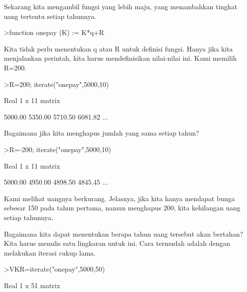 \documentclass[a4paper,10pt]{article}
\begin{document}
\begin{eulernotebook}
\begin{eulercomment}
\begin{eulercomment}
\begin{eulercomment}
\begin{eulercomment}
\begin{eulercomment}
\begin{eulercomment}
\begin{eulercomment}
\begin{eulercomment}
\begin{eulercomment}
Sekarang kita mengambil fungsi yang lebih maju, yang menambahkan
tingkat uang tertentu setiap tahunnya.
\end{eulercomment}
\begin{eulerprompt}
>function onepay (K) := K*q+R
\end{eulerprompt}
\begin{eulercomment}
Kita tidak perlu menentukan q atau R untuk definisi fungsi. Hanya jika
kita menjalankan perintah, kita harus mendefinisikan nilai-nilai ini.
Kami memilih R=200.
\end{eulercomment}
\begin{eulerprompt}
>R=200; iterate("onepay",5000,10)
\end{eulerprompt}
\begin{euleroutput}
  Real 1 x 11 matrix
  
      5000.00     5350.00     5710.50     6081.82     ...
\end{euleroutput}
\begin{eulercomment}
Bagaimana jika kita menghapus jumlah yang sama setiap tahun?
\end{eulercomment}
\begin{eulerprompt}
>R=-200; iterate("onepay",5000,10)
\end{eulerprompt}
\begin{euleroutput}
  Real 1 x 11 matrix
  
      5000.00     4950.00     4898.50     4845.45     ...
\end{euleroutput}
\begin{eulercomment}
Kami melihat uangnya berkurang. Jelasnya, jika kita hanya mendapat
bunga sebesar 150 pada tahun pertama, namun menghapus 200, kita
kehilangan uang setiap tahunnya.

Bagaimana kita dapat menentukan berapa tahun uang tersebut akan
bertahan? Kita harus menulis satu lingkaran untuk ini. Cara termudah
adalah dengan melakukan iterasi cukup lama.
\end{eulercomment}
\begin{eulerprompt}
>VKR=iterate("onepay",5000,50)
\end{eulerprompt}
\begin{euleroutput}
  Real 1 x 51 matrix
  

\end{euleroutput}
\end{eulercomment}
\end{eulercomment}
\end{eulercomment}
\end{eulercomment}
\end{eulercomment}
\end{eulercomment}
\end{eulercomment}
\end{eulercomment}
\end{eulernotebook}
\end{document}
